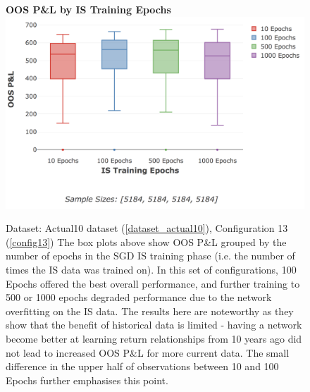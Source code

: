 \documentclass[a4paper,11pt,oneside]{article}
\theoremstyle{plain}
\theoremstyle{definition}
\begin{document}
	\begin{figure}[H]
		\centering 
		\textbf{OOS P\&L by IS Training Epochs}
		\includegraphics[scale=0.4]{images/results/8_3_historical/max_epochs.png}
		\caption[OOS P\&L by IS Training Epochs]
		{
			Dataset: Actual10 dataset (\ref{dataset_actual10}), Configuration 13 (\ref{config13}) 
			\newline The box plots above show OOS P\&L grouped by the number of epochs in the SGD IS training phase (i.e. the number of times the IS data was trained on). In this set of configurations, 100 Epochs offered the best overall performance, and further training to 500 or 1000 epochs degraded performance due to the network overfitting on the IS data. The results here are noteworthy as they show that the benefit of historical data is limited - having a network become better at learning return relationships from 10 years ago did not lead to increased OOS P\&L for more current data. The small difference in the upper half of observations between 10 and 100 Epochs further emphasises this point.
		}
		\label{figure-results_pl_max_epochs}
	\end{figure}
	
\end{document}
